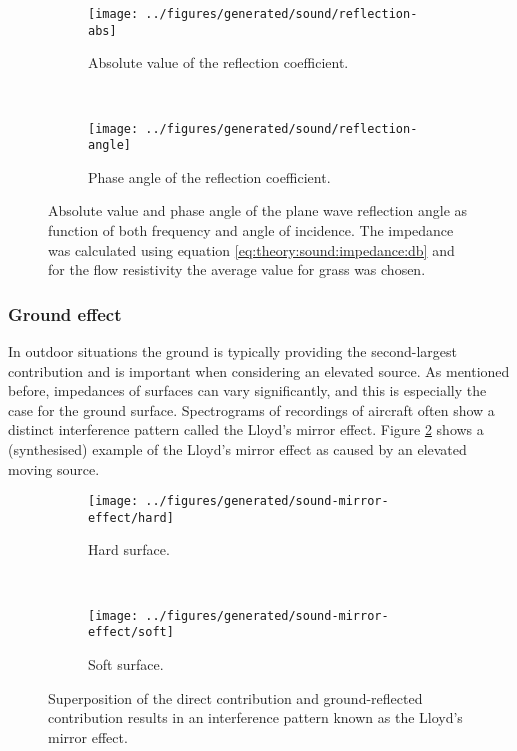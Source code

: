\begin{figure}
    \begin{subfigure}{\textwidth}
        \texttt{[image: ../figures/generated/sound/reflection-abs]}
        \caption{Absolute value of the reflection coefficient.}
    \end{subfigure}
    ~
    \begin{subfigure}{\textwidth}
        \texttt{[image: ../figures/generated/sound/reflection-angle]}
        \caption{Phase angle of the reflection coefficient.}
    \end{subfigure}
    \caption{Absolute value and phase angle of the plane wave reflection angle as function of both frequency and angle of incidence. The impedance was calculated using equation \eqref{eq:theory:sound:impedance:db} and for the flow resistivity the average value for grass was chosen.}
    \label{fig:theory:sound:reflection}
\end{figure}

\subsubsection{Ground effect}
In outdoor situations the ground is typically providing the second-largest
contribution and is important when considering an elevated source. As mentioned
before, impedances of surfaces can vary significantly, and this is especially
the case for the ground surface. Spectrograms of recordings of aircraft often
show a distinct interference pattern called the Lloyd's mirror effect. Figure
\ref{fig:theory:sound:reflection:ground} shows a (synthesised) example of the
Lloyd's mirror effect as caused by an elevated moving source.

\begin{figure}
    \begin{subfigure}{\textwidth}
        \texttt{[image: ../figures/generated/sound-mirror-effect/hard]}
        \caption{Hard surface.}
    \end{subfigure}
    ~
    \begin{subfigure}{\textwidth}
        \texttt{[image: ../figures/generated/sound-mirror-effect/soft]}
        \caption{Soft surface.}
    \end{subfigure}
    \caption{Superposition of the direct contribution and ground-reflected contribution results in an interference pattern known as the Lloyd's mirror effect.}
    \label{fig:theory:sound:reflection:ground}
\end{figure}

